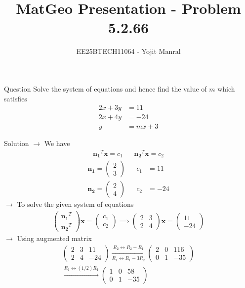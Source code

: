 \documentclass{beamer}
\title{MatGeo Presentation - Problem 5.2.66}
\author{EE25BTECH11064 - Yojit Manral}
\date{}
\numberwithin{equation}{section}
\theoremstyle{remark}
\newcommand{\myvec}[1]{\ensuremath{\begin{pmatrix}#1\end{pmatrix}}}
\let\vec\mathbf
\begin{document}
\frame{\titlepage}
\begin{frame}{Question}
Solve the system of equations and hence find the value of $m$ which satisfies
\begin{align}
    2x + 3y &= 11 \\
    2x + 4y &= -24 \\
    y &= mx + 3
\end{align}
\end{frame}

\begin{frame}{Solution}
$\rightarrow$ We have
\begin{align*} \vec{n_1}^T\vec{x} = c_1 && \vec{n_2}^T\vec{x} = c_2 \end{align*}
\begin{align}
    \vec{n_1} = \myvec{2\\3} && c_1 &= 11 \\
    \vec{n_2} = \myvec{2\\4} && c_2 &= -24
\end{align}
$\rightarrow$ To solve the given system of equations
\begin{align}
    \myvec{\vec{n_1}^T\\\vec{n_2}^T}\vec{x} = \myvec{c_1\\c_2} \implies \myvec{2&3\\2&4}\vec{x} = \myvec{11\\-24}
\end{align}
$\rightarrow$ Using augmented matrix
\begin{align}
    \left(\begin{array}{cc|c} 2&3&11\\2&4&-24 \end{array}\right)
    \xrightarrow[R_1 \leftrightarrow R_1 - 3R_2]{R_2 \leftrightarrow R_2 - R_1} \left(\begin{array}{cc|c} 2&0&116\\0&1&-35 \end{array}\right) \\
    \xrightarrow{R_1 \leftrightarrow (1/2)R_1} \left(\begin{array}{cc|c} 1&0&58\\0&1&-35 \end{array}\right)
\end{align}
\end{frame}
\end{document}
